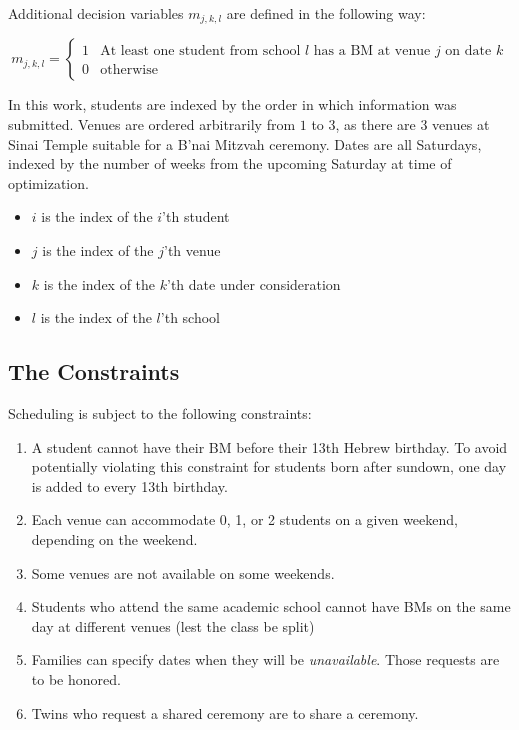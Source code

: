\documentclass[11pt]{article}
\begin{document}
Additional decision variables $m_{j,k,l}$ are defined in the following way:

\begin{equation}\label{m}
m_{j,k,l}=
\begin{cases} 
      1 & \text{At least one student from school $l$ has a BM at venue $j$ on date $k$} \\
      0 & \text{otherwise}
   \end{cases}
\end{equation}

In this work, students are indexed by the order in which information was submitted. Venues are ordered arbitrarily from $1$ to $3$, as there are $3$ venues at Sinai Temple suitable for a B'nai Mitzvah ceremony. Dates are all Saturdays, indexed by the number of weeks from the upcoming Saturday at time of optimization.

\begin{itemize}
\item $i$ is the index of the $i$'th student
\item $j$ is the index of the $j$'th venue
\item $k$ is the index of the $k$'th date under consideration
\item $l$ is the index of the $l$'th school
\end{itemize}




\subsection{The Constraints}

Scheduling is subject to the following constraints:

\begin{enumerate}
\item A student cannot have their BM before their 13th Hebrew birthday. To avoid potentially violating this constraint for students born after sundown, one day is added to every 13th birthday.
\item Each venue can accommodate 0, 1, or 2 students on a given weekend, depending on the weekend.
\item Some venues are not available on some weekends.
\item Students who attend the same academic school cannot have BMs on the same day at different venues (lest the class be split)
\item Families can specify dates when they will be \emph{unavailable}. Those requests are to be honored.
\item Twins who request a shared ceremony are to share a ceremony.
\end{enumerate}
\end{document}
